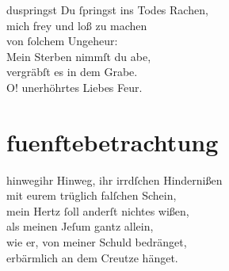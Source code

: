 \documentclass[abbrwidth=6em,tocstyle=ref-genre,shorttitlesize=50]{ees}
\begin{document}
{\begin{movement}{duspringst}
  \voice[Coro]
  Du ſpringst ins Todes Rachen,\\
  mich frey und loß zu machen\\
  von ſolchem Ungeheur:\\
  Mein Sterben nimmſt du abe,\\
  vergräbſt es in dem Grabe.\\
  O! unerhöhrtes Liebes Feur.
\end{movement}

\part{fuenftebetrachtung}

\begin{movement}{hinwegihr}
  \voice[Coro]
  Hinweg, ihr irrdſchen Hindernißen\\
  mit eurem trüglich falſchen Schein,\\
  mein Hertz ſoll anderſt nichtes wißen,\\
  als meinen Jeſum gantz allein,\\
  wie er, von meiner Schuld bedränget,\\
  erbärmlich an dem Creutze hänget.
\end{movement}

}
\end{document}
